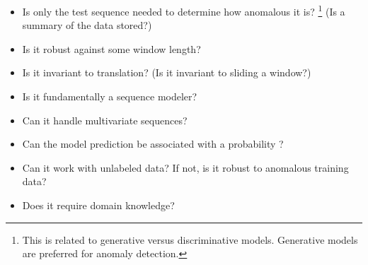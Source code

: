 \begin{itemize}

\item Is only the test sequence needed to determine how anomalous it is?%
\footnote{This is related to generative versus discriminative models. Generative models are preferred for anomaly detection.}
(Is a summary of the data stored?)

\item Is it robust against some window length?

\item Is it invariant to translation? (Is it invariant to sliding a window?)

\item Is it fundamentally a sequence modeler?

\item Can it handle multivariate sequences?

\item Can the model prediction be associated with a probability \cite{Graves2013b}?

\item Can it work with unlabeled data? If not, is it robust to anomalous training data?

\item Does it require domain knowledge?

\end{itemize}


